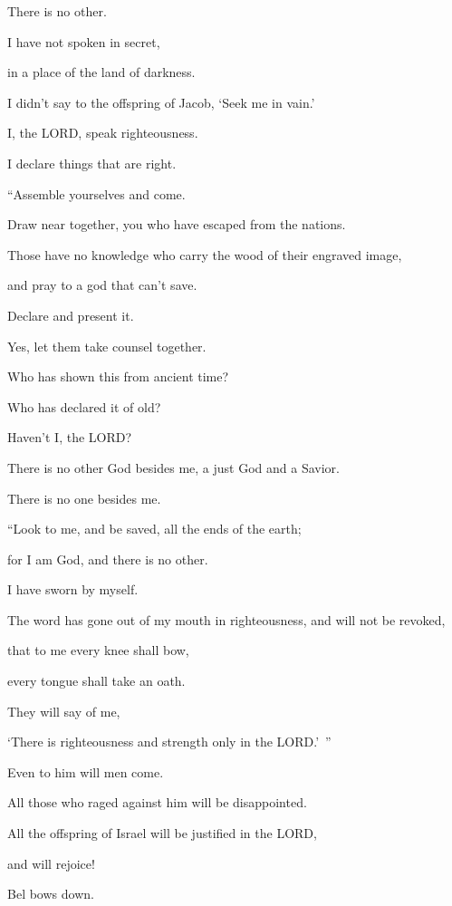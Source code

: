 There is no other.

\myverse{}I have not spoken in secret,

in a place of the land of darkness.

I didn’t say to the offspring of Jacob, ‘Seek me in vain.’

I, the LORD, speak righteousness.

I declare things that are right.


\vspace{\baselineskip} \myverse{}“Assemble yourselves and come.

Draw near together, you who have escaped from the nations.

Those have no knowledge who carry the wood of their engraved image,

and pray to a god that can’t save.

\myverse{}Declare and present it.

Yes, let them take counsel together.

Who has shown this from ancient time?

Who has declared it of old?

Haven’t I, the LORD?

There is no other God besides me, a just God and a Savior.

There is no one besides me.


\vspace{\baselineskip} \myverse{}“Look to me, and be saved, all the ends of the earth;

for I am God, and there is no other.

\myverse{}I have sworn by myself.

The word has gone out of my mouth in righteousness, and will not be revoked,

that to me every knee shall bow,

every tongue shall take an oath.

\myverse{}They will say of me,

‘There is righteousness and strength only in the LORD.’ ”

Even to him will men come.

All those who raged against him will be disappointed.

\myverse{}All the offspring of Israel will be justified in the LORD,

and will rejoice!


\mychapter{} \myverse*{}Bel bows down.

